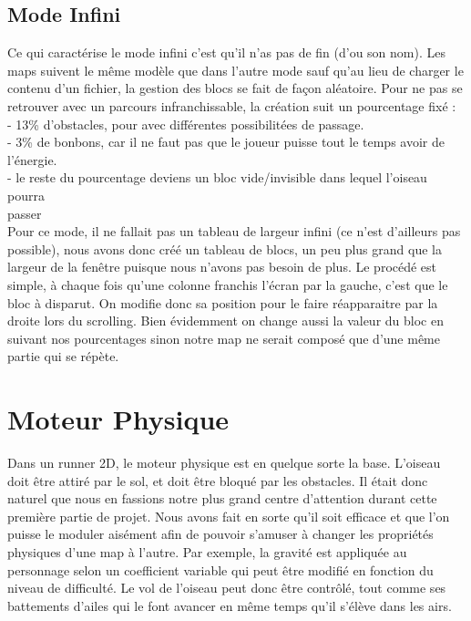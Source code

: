 \documentclass [11pt]{report}
\begin{document}
		\vspace{10mm}
		
	
		\subsection{Mode Infini}
		Ce qui caractérise le mode infini c'est qu'il n'as pas de fin (d'ou son nom). Les maps suivent le même modèle que dans l'autre mode sauf qu'au lieu de charger le contenu d'un fichier, la gestion des blocs se fait de façon aléatoire. Pour ne pas se retrouver avec un parcours infranchissable, la création suit un pourcentage fixé :\\
		
		\indent \indent - 13\% d'obstacles, pour avec différentes possibilitées de passage.\\
		\indent \indent - 3\% de bonbons, car il ne faut pas que le joueur puisse tout le temps avoir de \indent \indent l'énergie.\\
		\indent \indent - le reste du pourcentage deviens un bloc vide/invisible dans lequel l'oiseau pourra\\
		\indent \indent passer\\
		
			
		Pour ce mode, il ne fallait pas un tableau de largeur infini (ce n'est d'ailleurs pas possible), nous avons donc créé un tableau de blocs, un peu plus grand que la largeur de la fenêtre puisque nous n'avons pas besoin de plus. Le procédé est simple, à chaque fois qu'une colonne franchis l'écran par la gauche, c'est que le bloc à disparut. On modifie donc sa position pour le faire réapparaitre par la droite lors du scrolling. Bien évidemment on change aussi la valeur du bloc en suivant nos pourcentages sinon notre map ne serait composé que d'une même partie qui se répète.


	\vspace{15mm}


	\section{Moteur Physique}
		Dans un runner 2D, le moteur physique est en quelque sorte la base. L'oiseau doit être attiré par le sol, et doit être bloqué par les obstacles. Il était donc naturel que nous en fassions notre plus grand centre d'attention durant cette première partie de projet. Nous avons fait en sorte qu'il soit efficace et que l'on puisse le moduler aisément afin de pouvoir s'amuser à changer les propriétés physiques d'une map à l'autre. Par exemple, la gravité est appliquée au personnage selon un coefficient variable qui peut être modifié en fonction du niveau de difficulté. Le vol  de l'oiseau peut donc être contrôlé, tout comme ses battements d'ailes qui le font avancer en même temps qu'il s'élève dans les airs. \\\\
		
\end{document}
